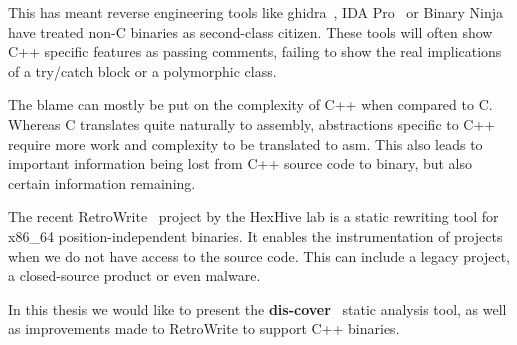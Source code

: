 \documentclass[a4paper,11pt,oneside]{report}
\begin{document}

This has meant reverse engineering tools like ghidra~\cite{ghidra}, IDA Pro~\cite{ida} or Binary Ninja~\cite{binja} have treated non-C binaries as second-class citizen.
These tools will often show C++ specific features as passing comments, failing to show the real implications of a try/catch block or a polymorphic class.


The blame can mostly be put on the complexity of C++ when compared to C.
Whereas C translates quite naturally to assembly, abstractions specific to C++ require more work and complexity to be translated to asm.
This also leads to important information being lost from C++ source code to binary, but also certain information remaining.



The recent RetroWrite~\cite{dinesh20oakland} project by the HexHive lab is a static rewriting tool for x86\_64 position-independent binaries.
It enables the instrumentation of projects when we do not have access to the source code.
This can include a legacy project, a closed-source product or even malware.




In this thesis we would like to present the \textbf{dis-cover}~\cite{discovergithub} static analysis tool,
as well as improvements made to RetroWrite to support C++ binaries.


\end{document}
